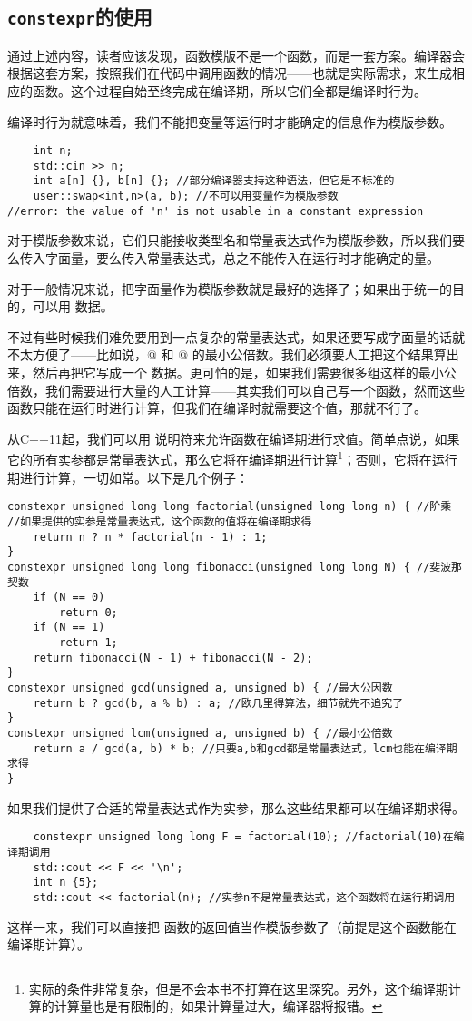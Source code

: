 \subsection*{\texttt{constexpr}的使用}
通过上述内容，读者应该发现，函数模版不是一个函数，而是一套方案。编译器会根据这套方案，按照我们在代码中调用函数的情况——也就是实际需求，来生成相应的函数。这个过程自始至终完成在编译期，所以它们全都是编译时行为。\par
编译时行为就意味着，我们不能把变量等运行时才能确定的信息作为模版参数。
\begin{lstlisting}
    int n;
    std::cin >> n;
    int a[n] {}, b[n] {}; //部分编译器支持这种语法，但它是不标准的
    user::swap<int,n>(a, b); //不可以用变量作为模版参数
//error: the value of 'n' is not usable in a constant expression
\end{lstlisting}
对于模版参数来说，它们只能接收类型名和常量表达式作为模版参数，所以我们要么传入字面量，要么传入常量表达式，总之不能传入在运行时才能确定的量。\par
对于一般情况来说，把字面量作为模版参数就是最好的选择了；如果出于统一的目的，可以用 \lstinline@constexpr@ 数据。\par
不过有些时候我们难免要用到一点复杂的常量表达式，如果还要写成字面量的话就不太方便了——比如说，@ 和 @ 的最小公倍数。我们必须要人工把这个结果算出来，然后再把它写成一个 \lstinline@constexpr@ 数据。更可怕的是，如果我们需要很多组这样的最小公倍数，我们需要进行大量的人工计算——其实我们可以自己写一个函数，然而这些函数只能在运行时进行计算，但我们在编译时就需要这个值，那就不行了。\par
从C++11起，我们可以用 \lstinline@constexpr@ 说明符来允许函数在编译期进行求值。简单点说，如果它的所有实参都是常量表达式，那么它将在编译期进行计算\footnote{实际的条件非常复杂，但是不会本书不打算在这里深究。另外，这个编译期计算的计算量也是有限制的，如果计算量过大，编译器将报错。}；否则，它将在运行期进行计算，一切如常。以下是几个例子：
\begin{lstlisting}
constexpr unsigned long long factorial(unsigned long long n) { //阶乘
//如果提供的实参是常量表达式，这个函数的值将在编译期求得
    return n ? n * factorial(n - 1) : 1;
}
constexpr unsigned long long fibonacci(unsigned long long N) { //斐波那契数
    if (N == 0)
        return 0;
    if (N == 1)
        return 1;
    return fibonacci(N - 1) + fibonacci(N - 2);
}
constexpr unsigned gcd(unsigned a, unsigned b) { //最大公因数
    return b ? gcd(b, a % b) : a; //欧几里得算法，细节就先不追究了
}
constexpr unsigned lcm(unsigned a, unsigned b) { //最小公倍数
    return a / gcd(a, b) * b; //只要a,b和gcd都是常量表达式，lcm也能在编译期求得
}
\end{lstlisting}
如果我们提供了合适的常量表达式作为实参，那么这些结果都可以在编译期求得。
\begin{lstlisting}
    constexpr unsigned long long F = factorial(10); //factorial(10)在编译期调用
    std::cout << F << '\n';
    int n {5};
    std::cout << factorial(n); //实参n不是常量表达式，这个函数将在运行期调用
\end{lstlisting}\par
这样一来，我们可以直接把 \lstinline@constexpr@ 函数的返回值当作模版参数了（前提是这个函数能在编译期计算）。\par
